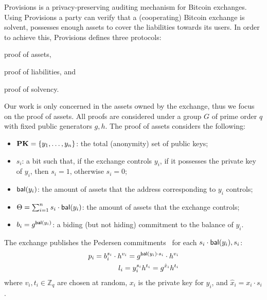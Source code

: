 Provisions is a privacy-preserving auditing mechanism for Bitcoin exchanges.
Using Provisions a party can verify that a (cooperating) Bitcoin exchange is
solvent, \ie possesses enough assets to cover the liabilities towards its
users. In order to achieve this, Provisions defines three protocols:
\begin{inparaenum}[i)]
    \item proof of assets,
    \item proof of liabilities, and
    \item proof of solvency.
\end{inparaenum}
Our work is only concerned in the assets owned by the exchange, thus we focus
on the proof of assets. All proofs are considered under a group $G$ of prime
order $q$ with fixed public generators $g, h$. The proof of assets considers
the following:
\begin{itemize}
    \item $\text{\textbf{PK}} = \{y_1, \dots, y_n \}$: the total (anonymity) set of public keys;
    \item $s_i$: a bit such that, if the exchange controls $y_i$, \ie if it possesses the private key of $y_i$, then $s_i = 1$, otherwise $s_i = 0$;
    \item $\mathsf{bal}(y_i)$: the amount of assets that the address corresponding to $y_i$ controls;
    \item $\Theta = \sum_{i = 1}^n s_i \cdot \mathsf{bal}(y_i)$: the amount of assets that the exchange controls;
    \item $b_i = g^{\mathsf{bal}(y_i)}$: a biding (but not hiding) commitment  to the balance of $y_i$.
\end{itemize}
The exchange publishes the Pedersen commitments~\cite{C:Pedersen91} for each $s_i \cdot
\mathsf{bal}(y_i), s_i$:
\begin{align}
    p_i = b_i^{s_i} \cdot h^{v_i} = g^{\mathsf{bal}(y_i) \cdot s_i} \cdot h^{v_i} \label{eq:balance-commit} \\
    l_i = y_i^{s_i}h^{t_i} =  g^{\hat{x}_i}h^{t_i} \label{eq:ownership-commit}
\end{align}
where $v_i, t_i \in \mathbb{Z}_q$ are chosen at random,
$x_i$ is the private key for $y_i$, and $\hat{x}_i = x_i \cdot s_i$.

